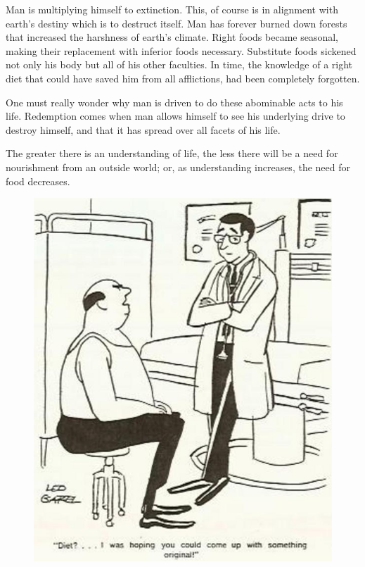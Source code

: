 \documentclass[landscape,twocolumn,letterpaper]{article}
\begin{document}
Man is multiplying himself to extinction. This, of course is in
alignment with earth's destiny which is to destruct itself. Man has
forever burned down forests that increased the harshness of earth's
climate. Right foods became seasonal, making their replacement with
inferior foods necessary. Substitute foods sickened not only his body
but all of his other faculties. In time, the knowledge of a right diet
that could have saved him from all afflictions, had been completely
forgotten.

One must really wonder why man is driven to do these abominable acts
to his life. Redemption comes when man allows himself to see his
underlying drive to destroy himself, and that it has spread over all
facets of his life.

The greater there is an understanding of life, the less there will be
a need for nourishment from an outside world; or, as understanding
increases, the need for food decreases.

\begin{figure} \centering
  \includegraphics[height=0.4\textheight,bb=0 0 600 730]{p15.jpg}
\end{figure}
\end{document}
